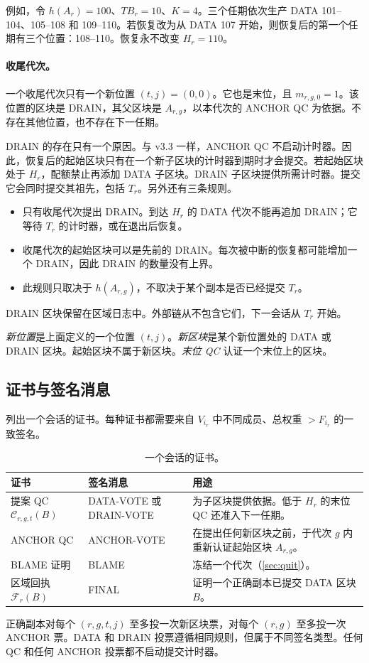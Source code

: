 \documentclass[11pt,a4paper]{article}
\newcommand{\QC}{\mathcal C}
\newcommand{\FC}{\mathcal F}
\newcommand{\TB}{\mathit{TB}}
\begin{document}
例如，令 $h(A_r)=100$、$\TB_r=10$、$K=4$。三个任期依次生产 DATA 101--104、105--108 和 109--110。若恢复改为从 DATA 107 开始，则恢复后的第一个任期有三个位置：108--110。恢复永不改变 $H_r=110$。

\paragraph{收尾代次。}
一个收尾代次只有一个新位置 $(t,j)=(0,0)$。它也是末位，且 $m_{r,g,0}=1$。该位置的区块是 DRAIN，其父区块是 $A_{r,g}$，以本代次的 ANCHOR QC 为依据。不存在其他位置，也不存在下一任期。

DRAIN 的存在只有一个原因。与 v3.3 一样，ANCHOR QC 不启动计时器。因此，恢复后的起始区块只有在一个新子区块的计时器到期时才会提交。若起始区块处于 $H_r$，配额禁止再添加 DATA 子区块。DRAIN 子区块提供所需计时器。提交它会同时提交其祖先，包括 $T_r$。另外还有三条规则。
\begin{itemize}
\item 只有收尾代次提出 DRAIN。到达 $H_r$ 的 DATA 代次不能再追加 DRAIN；它等待 $T_r$ 的计时器，或在退出后恢复。
\item 收尾代次的起始区块可以是先前的 DRAIN。每次被中断的恢复都可能增加一个 DRAIN，因此 DRAIN 的数量没有上界。
\item 此规则只取决于 $h(A_{r,g})$，不取决于某个副本是否已经提交 $T_r$。
\end{itemize}
DRAIN 区块保留在区域日志中。外部链从不包含它们，下一会话从 $T_r$ 开始。

\emph{新位置}是上面定义的一个位置 $(t,j)$。\emph{新区块}是某个新位置处的 DATA 或 DRAIN 区块。起始区块不属于新区块。\emph{末位 QC} 认证一个末位上的区块。

\subsection{证书与签名消息}\label{sec:certificates}
 列出一个会话的证书。每种证书都需要来自 $V_{i_r}$ 中不同成员、总权重 $>F_{i_r}$ 的一致签名。
\begin{table}[htbp]\centering\small
\caption{一个会话的证书。}\label{tab:certificates}
\begin{tabularx}{\linewidth}{@{}p{.25\linewidth}p{.24\linewidth}Y@{}}\toprule
证书 & 签名消息 & 用途\\\midrule
提案 QC $\QC_{r,g,t}(B)$ & DATA-VOTE 或 DRAIN-VOTE & 为子区块提供依据。低于 $H_r$ 的末位 QC 还准入下一任期。\\
ANCHOR QC & ANCHOR-VOTE & 在提出任何新区块之前，于代次 $g$ 内重新认证起始区块 $A_{r,g}$。\\
BLAME 证明 & BLAME & 冻结一个代次（\cref{sec:quit}）。\\
区域回执 $\FC_r(B)$ & FINAL & 证明一个正确副本已提交 DATA 区块 $B$。\\\bottomrule
\end{tabularx}
\end{table}
正确副本对每个 $(r,g,t,j)$ 至多投一次新区块票，对每个 $(r,g)$ 至多投一次 ANCHOR 票。DATA 和 DRAIN 投票遵循相同规则，但属于不同签名类型。任何 QC 和任何 ANCHOR 投票都不启动提交计时器。
\end{document}
